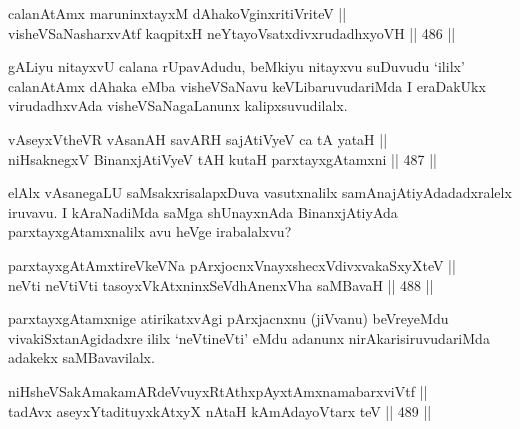 
\begin{shl}
calanAtAmx maruninxtayxM dAhakoV\s ginxritiVriteV || \\
visheVSaNasharxvAtf kaqpitxH neYtayoVsatxdivxrudadhxyoVH \hfill || 486 ||  
\end{shl}

\begin{artha}
gALiyu nitayxvU calana rUpavAdudu, beMkiyu nitayxvu suDuvudu `ililx'
calanAtAmx dAhaka eMba visheVSaNavu keVLibaruvudariMda I eraDakUkx
virudadhxvAda visheVSaNagaLanunx kalipxsuvudilalx.
\end{artha}


\begin{shl}
vAseyxV\s theVR vAsanAH savARH sajAtiVyeV ca tA yataH || \\
niHsaknegxV BinanxjAtiVyeV tAH kutaH parxtayxgAtamxni \hfill || 487 ||  
\end{shl}

\begin{artha}
elAlx vAsanegaLU saMsakxrisalapxDuva vasutxnalilx
samAnajAti\-\break yAdadadxralelx iruvavu. I kAraNadiMda saMga shUnayxnAda
BinanxjAtiyAda parxtayxgAtamxnalilx avu heVge irabalalxvu?
\end{artha}

\begin{shl}
parxtayxgAtAmxtireVkeVNa pArxjocnxV\s nayxshecxVdivxvakaSxyXteV || \\
neVti neVtiVti tasoyxVkAtxninxSeVdhAnenxVha saMBavaH \hfill || 488 ||  
\end{shl}

\begin{artha}
parxtayxgAtamxnige atirikatxvAgi pArxjacnxnu (jiVvanu) beVreyeMdu\break
vivakiSxtanAgidadxre ililx `neVtineVti' eMdu adanunx
nirAkarisiruvudariMda adakekx saMBavavilalx.
\end{artha}


\begin{shl}
niHsheVSakAmakamARdeVvuyxRtAthxpAyx\s \s tAmxnamabarxviVtf || \\
tadAvx aseyxYtadituyxkAtxyX nAtaH kAmAdayoV\s tarx teV \hfill || 489 ||  
\end{shl}

